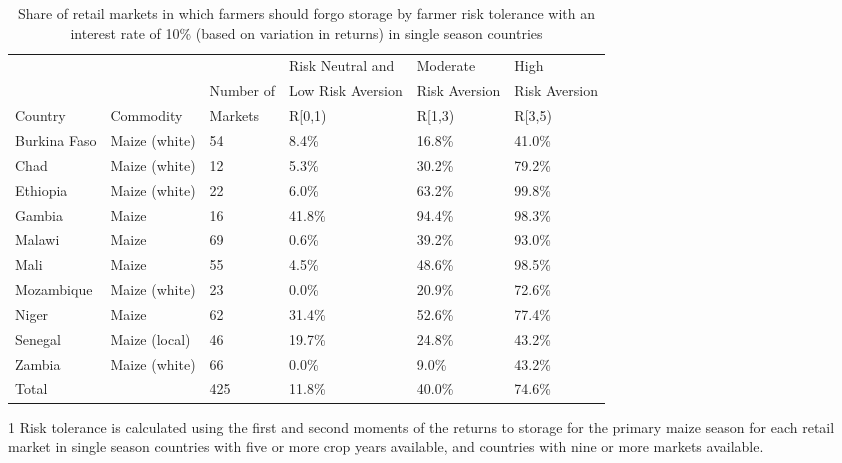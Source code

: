\begin{table}[ht]
	\begin{threeparttable}[t]
		\centering
		\caption{Share of retail markets in which farmers should forgo storage by farmer risk tolerance with an interest rate of 10\% (based on variation in returns) in single season countries}
		\label{tab:risk_return_i}
		\begin{tabular}{|lll|lll|}
			\hline 
			&  & & Risk Neutral and & Moderate & High \\ 
			& & Number of  & Low Risk Aversion & Risk Aversion &  Risk Aversion\\ 
			Country&Commodity & Markets& R\in[0,1) &  R\in[1,3) & R\in[3,5) \\
			\hline
Burkina Faso & Maize (white) & 54 & 8.4\% & 16.8\% & 41.0\% \\ 
  Chad & Maize (white) & 12 & 5.3\% & 30.2\% & 79.2\% \\ 
  Ethiopia & Maize (white) & 22 & 6.0\% & 63.2\% & 99.8\% \\ 
  Gambia & Maize & 16 & 41.8\% & 94.4\% & 98.3\% \\ 
  Malawi & Maize & 69 & 0.6\% & 39.2\% & 93.0\% \\ 
  Mali & Maize & 55 & 4.5\% & 48.6\% & 98.5\% \\ 
  Mozambique & Maize (white) & 23 & 0.0\% & 20.9\% & 72.6\% \\ 
  Niger & Maize & 62 & 31.4\% & 52.6\% & 77.4\% \\ 
  Senegal & Maize (local) & 46 & 19.7\% & 24.8\% & 43.2\% \\ 
  Zambia & Maize (white) & 66 & 0.0\% & 9.0\% & 43.2\% \\ 
  \hline
  Total &  & 425 & 11.8\% & 40.0\% & 74.6\% \\ 
  \hline 
\end{tabular}
\begin{tablenotes}
\item [1] \footnotesize Risk tolerance is calculated using the first and second moments of the returns to storage for the primary maize season for each retail market in single season countries with five or more crop years available, and countries with nine or more markets available.
\end{tablenotes}
\end{threeparttable}
\end{table}
